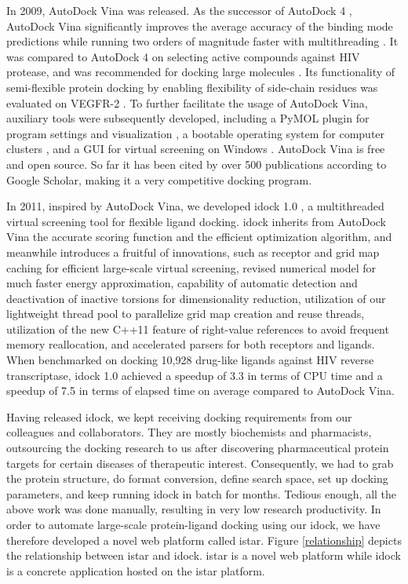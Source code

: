 \documentclass[12pt]{article}
\begin{document}
In 2009, AutoDock Vina \citep{595} was released. As the successor of AutoDock 4 \citep{596}, AutoDock Vina significantly improves the average accuracy of the binding mode predictions while running two orders of magnitude faster with multithreading \citep{595}. It was compared to AutoDock 4 on selecting active compounds against HIV protease, and was recommended for docking large molecules \citep{556}. Its functionality of semi-flexible protein docking by enabling flexibility of side-chain residues was evaluated on VEGFR-2 \citep{1084}. To further facilitate the usage of AutoDock Vina, auxiliary tools were subsequently developed, including a PyMOL plugin for program settings and visualization \citep{609}, a bootable operating system for computer clusters \citep{773}, and a GUI for virtual screening on Windows \citep{1250}. AutoDock Vina is free and open source. So far it has been cited by over 500 publications according to Google Scholar, making it a very competitive docking program.

In 2011, inspired by AutoDock Vina, we developed idock 1.0 \citep{1153}, a multithreaded virtual screening tool for flexible ligand docking. idock inherits from AutoDock Vina the accurate scoring function and the efficient optimization algorithm, and meanwhile introduces a fruitful of innovations, such as receptor and grid map caching for efficient large-scale virtual screening, revised numerical model for much faster energy approximation, capability of automatic detection and deactivation of inactive torsions for dimensionality reduction, utilization of our lightweight thread pool to parallelize grid map creation and reuse threads, utilization of the new C++11 feature of right-value references to avoid frequent memory reallocation, and accelerated parsers for both receptors and ligands. When benchmarked on docking 10,928 drug-like ligands against HIV reverse transcriptase, idock 1.0 achieved a speedup of 3.3 in terms of CPU time and a speedup of 7.5 in terms of elapsed time on average compared to AutoDock Vina.

Having released idock, we kept receiving docking requirements from our colleagues and collaborators. They are mostly biochemists and pharmacists, outsourcing the docking research to us after discovering pharmaceutical protein targets for certain diseases of therapeutic interest. Consequently, we had to grab the protein structure, do format conversion, define search space, set up docking parameters, and keep running idock in batch for months. Tedious enough, all the above work was done manually, resulting in very low research productivity. In order to automate large-scale protein-ligand docking using our idock, we have therefore developed a novel web platform called istar. Figure \ref{relationship} depicts the relationship between istar and idock. istar is a novel web platform while idock is a concrete application hosted on the istar platform.
\end{document}
